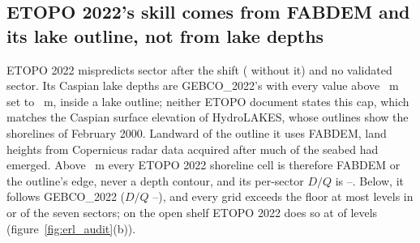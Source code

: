 \subsection{ETOPO 2022's skill comes from FABDEM and its lake outline, not from lake depths}
ETOPO 2022 mispredicts  sector after the shift ( without it) and no validated sector. Its Caspian lake depths are GEBCO\_2022's with every value above ~m set to ~m, inside a lake outline; neither ETOPO document states this cap, which matches the Caspian surface elevation of HydroLAKES, whose outlines show the shorelines of February 2000\citep{hydrolakes_doc,messager2016}. Landward of the outline it uses FABDEM, land heights from Copernicus radar data acquired after much of the seabed had emerged\citep{macferrin2025,hawker2022,copdem_handbook_i5}. Above ~m every ETOPO 2022 shoreline cell is therefore FABDEM or the outline's edge, never a depth contour, and its per-sector $D/Q$ is --. Below, it follows GEBCO\_2022 ($D/Q$ --), and every grid exceeds the floor at most levels in  or  of the seven sectors; on the open shelf ETOPO 2022 does so at  of  levels (figure~\ref{fig:erl_audit}(b)).

